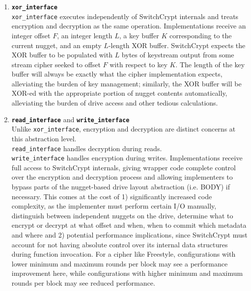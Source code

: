 \begin{enumerate}
   \item \textbf{\texttt{xor\_interface}}\\\texttt{xor\_interface} executes
   independently of SwitchCrypt internals and treats encryption and decryption
   as the same operation. Implementations receive an integer offset $F$, an
   integer length $L$, a key buffer $K$ corresponding to the current nugget, and
   an empty $L$-length XOR buffer. SwitchCrypt expects the XOR buffer to be
   populated with $L$ bytes of keystream output from some stream cipher seeked
   to offset $F$ with respect to key $K$. The length of the key buffer will
   always be exactly what the cipher implementation expects, alleviating the
   burden of key management; similarly, the XOR buffer will be XOR-ed with the
   appropriate portion of nugget contents automatically, alleviating the burden
   of drive access and other tedious calculations. \\
 \item \textbf{\texttt{read\_interface}} and
   \textbf{\texttt{write\_interface}}\\
   Unlike \texttt{xor\_interface}, encryption and decryption are
   distinct concerns at this abstraction level.
   \\\texttt{read\_interface} handles decryption during reads.
   \\\texttt{write\_interface} handles encryption during writes.
   Implementations receive full access to SwitchCrypt internals,
   giving wrapper code complete control over the encryption and
   decryption process and allowing implementers to bypass parts of the
   nugget-based drive layout abstraction (i.e. BODY) if necessary.
   This comes at the cost of 1) significantly increased code
   complexity, as the implementer 
   must perform certain I/O manually, distinguish between independent
   nuggets on the drive, determine what to encrypt or decrypt at what
   offset and when, when to commit which metadata and where and 2)
   potential performance implications, since SwitchCrypt must account
   for not having absolute control over its internal data structures
   during function invocation. For a cipher like Freestyle,
   configurations with lower minimum and maximum rounds per block may
   see a performance improvement here, while configurations with
   higher minimum and maximum rounds per block may see reduced
   performance.
\end{enumerate}

